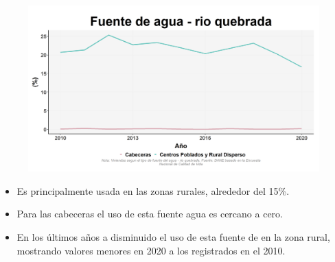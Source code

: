     \begin{figure}[H]
        \caption[Río o quebradas como fuentes de agua por zonas ]{\label{rio_zonas} }
        \begin{center}
        \includegraphics[width=\textwidth,keepaspectratio]{img/var_142_trend.png}
        \end{center}
    \end{figure}
            \begin{itemize}
                    \item Es principalmente usada en las zonas rurales, alrededor del 15\%.
                    \item Para las cabeceras el uso de esta fuente agua es cercano a cero.
                    \item En los últimos años a disminuido el uso de esta fuente de en la zona rural, mostrando valores menores en 2020 a los registrados en el 2010.
                    \end{itemize}

